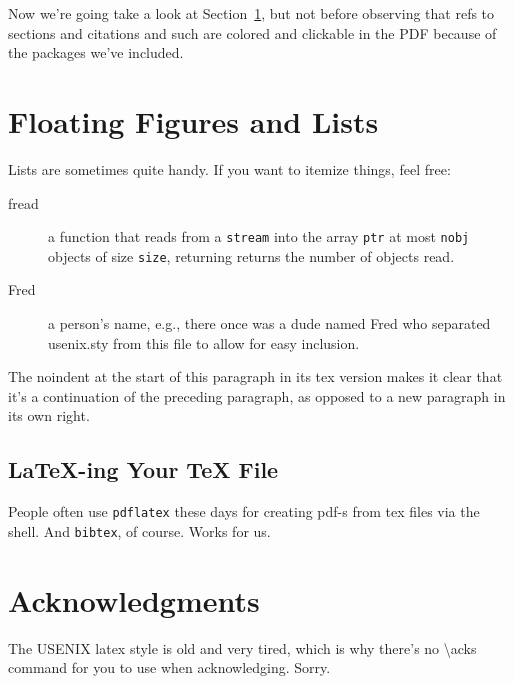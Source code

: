 Now we're going take a look at Section~\ref{sec:figs}, but not before
observing that refs to sections and citations and such are colored and
clickable in the PDF because of the packages we've included.

\section{Floating Figures and Lists}
\label{sec:figs}

Lists are sometimes quite handy. If you want to itemize things, feel
free:

\begin{description}
  
\item[fread] a function that reads from a \texttt{stream} into the
  array \texttt{ptr} at most \texttt{nobj} objects of size
  \texttt{size}, returning returns the number of objects read.

\item[Fred] a person's name, e.g., there once was a dude named Fred
  who separated usenix.sty from this file to allow for easy
  inclusion.
\end{description}

\noindent
The noindent at the start of this paragraph in its tex version makes
it clear that it's a continuation of the preceding paragraph, as
opposed to a new paragraph in its own right.


\subsection{LaTeX-ing Your TeX File}

People often use \texttt{pdflatex} these days for creating pdf-s from
tex files via the shell. And \texttt{bibtex}, of course. Works for us.

\section*{Acknowledgments}

The USENIX latex style is old and very tired, which is why
there's no \textbackslash{}acks command for you to use when
acknowledging. Sorry.







